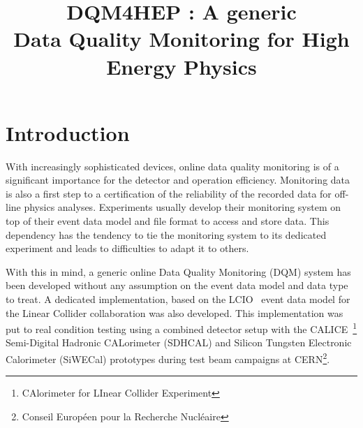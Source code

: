 \documentclass[conference]{IEEEtran}
\begin{document}
\title{DQM4HEP : A generic\\Data Quality Monitoring for High Energy Physics}

\author{


\and


\and


}

\maketitle

\IEEEpeerreviewmaketitle

\section{Introduction}

With increasingly sophisticated devices, online data quality monitoring is of a significant importance for the detector and operation efficiency. Monitoring data is also a first step to a certification of the reliability of the recorded data for off-line physics analyses. Experiments usually develop their monitoring system on top of their event data model and file format to access and store data. This dependency has the tendency to tie the monitoring system to its dedicated experiment and leads to difficulties to adapt it to others.

With this in mind, a generic online Data Quality Monitoring (DQM) system has been developed without any assumption on the event data model and data type to treat. A dedicated implementation, based on the LCIO~\cite{LCIO} event data model for the Linear Collider collaboration was also developed. This implementation was put to real condition testing using a combined detector setup with the CALICE~\footnote{CAlorimeter for LInear Collider Experiment} Semi-Digital Hadronic CALorimeter (SDHCAL) and Silicon Tungsten Electronic Calorimeter (SiWECal) prototypes during test beam campaigns at CERN\footnote{Conseil Européen pour la Recherche Nucléaire}.
\end{document}
